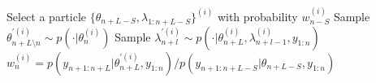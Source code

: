 \documentclass{article}
\begin{document}
\begin{algorithm}
\begin{algorithmic}
      \STATE Select a particle $\{\theta_{n+L-S}, \lambda_{1:n+L-S}\}^{(i)}$ with probability $w_{n-S}^{(i)}$
      \STATE Sample $\theta_{n+L \setminus n}^{'(i)} \sim p(\cdot|\theta_n^{(i)})$
        \STATE Sample $\lambda_{n+l}^{'(i)} \sim p(\cdot|\theta_{n+L}^{(i)}, \lambda_{n+l-1}^{(i)}, y_{1:n})$
      \ENDFOR
      \STATE $w_n^{(i)} = p(y_{n+1:n+L}|\theta_{n+L}^{'(i)}, y_{1:n})/p(y_{n+1:n+L-S}|\theta_{n+L-S}, y_{1:n})$
    \ENDFOR
  \ENDFOR
\end{algorithmic}
\end{algorithm}
\end{document}
